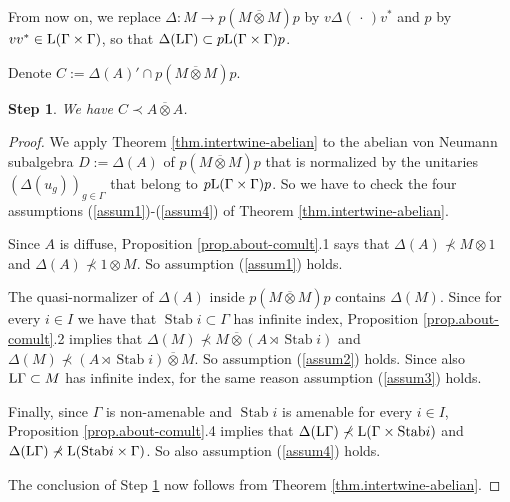\documentclass[a4paper,11pt]{amsart}
\numberwithin{equation}{section}
\newtheorem{step}{Step}[section]
\begin{document}
From now on, we replace ${\Delta} : M {\rightarrow} p(M {\mathbin{\overline{\otimes}}} M)p$ by $v {\Delta}(\, \cdot \,) v^*$ and $p$ by $vv^* \in {\mathord{\text{\rm L}}}(\Gamma \times \Gamma)$, so that ${\Delta}({\mathord{\text{\rm L}}} \Gamma) \subset p{\mathord{\text{\rm L}}}(\Gamma \times \Gamma)p$.

Denote $C := {\Delta}(A)' \cap p(M {\mathbin{\overline{\otimes}}} M) p$.

\begin{step}\label{step2}
We have $C {\prec} A {\mathbin{\overline{\otimes}}} A$.
\end{step}
\begin{proof}
We apply Theorem \ref{thm.intertwine-abelian} to the abelian von Neumann subalgebra $D := \Delta(A)$ of $p (M {\mathbin{\overline{\otimes}}} M)p$ that is normalized by the unitaries $(\Delta(u_g))_{g \in \Gamma}$ that belong to $p {\mathord{\text{\rm L}}}(\Gamma \times \Gamma) p$. So we have to check the four assumptions (\ref{assum1})-(\ref{assum4}) of Theorem \ref{thm.intertwine-abelian}.

Since $A$ is diffuse, Proposition \ref{prop.about-comult}.1 says that $\Delta(A) \not\prec M {\otimes} 1$ and $\Delta(A) \not\prec 1 {\otimes} M$. So assumption (\ref{assum1}) holds.

The quasi-normalizer of $\Delta(A)$ inside $p(M {\mathbin{\overline{\otimes}}} M)p$ contains $\Delta(M)$. Since for every $i \in I$ we have that ${\operatorname{Stab}} i \subset \Gamma$ has infinite index, Proposition \ref{prop.about-comult}.2 implies that $\Delta(M) \not\prec M {\mathbin{\overline{\otimes}}} (A \rtimes {\operatorname{Stab}} i)$ and $\Delta(M) \not\prec (A \rtimes {\operatorname{Stab}} i) {\mathbin{\overline{\otimes}}} M$. So assumption (\ref{assum2}) holds. Since also ${\mathord{\text{\rm L}}} \Gamma \subset M$ has infinite index, for the same reason assumption (\ref{assum3}) holds.

Finally, since $\Gamma$ is non-amenable and ${\operatorname{Stab}} i$ is amenable for every $i \in I$, Proposition \ref{prop.about-comult}.4 implies that $\Delta({\mathord{\text{\rm L}}} \Gamma) \not\prec {\mathord{\text{\rm L}}} (\Gamma \times {\operatorname{Stab}} i)$ and $\Delta({\mathord{\text{\rm L}}} \Gamma) \not\prec {\mathord{\text{\rm L}}} ({\operatorname{Stab}} i \times \Gamma)$. So also assumption (\ref{assum4}) holds.

The conclusion of Step \ref{step2} now follows from Theorem \ref{thm.intertwine-abelian}.
\end{proof}
\end{document}
